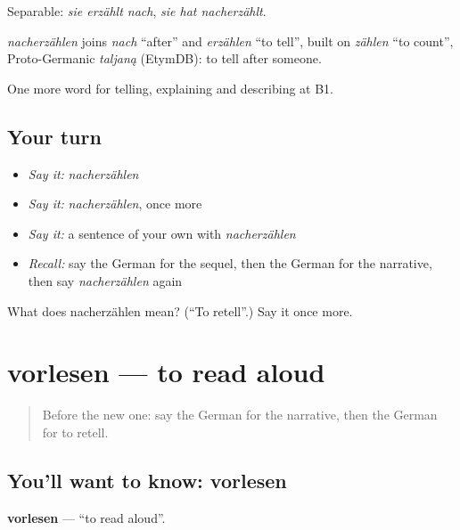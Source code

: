 Separable: \emph{sie erzählt nach}, \emph{sie hat nacherzählt}.

\begin{cousinweb}
\emph{nacherzählen} joins \emph{nach} \textquotedblleft{}after\textquotedblright{} and \emph{erzählen} \textquotedblleft{}to tell\textquotedblright{}, built on \emph{zählen} \textquotedblleft{}to count\textquotedblright{}, Proto-Germanic \emph{taljaną} (EtymDB): to tell after someone.
\end{cousinweb}

\begin{grammarlens}[title={What you've built}]
One more word for telling, explaining and describing at B1.
\end{grammarlens}

\subsection*{Your turn}
\begin{itemize}
\raggedright
  \item \emph{Say it:} \emph{nacherzählen}
  \item \emph{Say it:} \emph{nacherzählen}, once more
  \item \emph{Say it:} a sentence of your own with \emph{nacherzählen}
  \item \emph{Recall:} say the German for the sequel, then the German for the narrative, then say \emph{nacherzählen} again
\end{itemize}

\begin{tcolorbox}[breakable,colback=teal!4,colframe=teal!35!black,title={Before you move on}]
What does nacherzählen mean? (\textquotedblleft{}To retell\textquotedblright{}.) Say it once more.
\end{tcolorbox}
\section[vorlesen]{vorlesen — to read aloud}

\label{lesson:GE-C317-vorlesen}



\begin{quote}
Before the new one: say the German for the narrative, then the German for to retell.
\end{quote}

\subsection*{You'll want to know: vorlesen}
\textbf{vorlesen} — \textquotedblleft{}to read aloud\textquotedblright{}.


